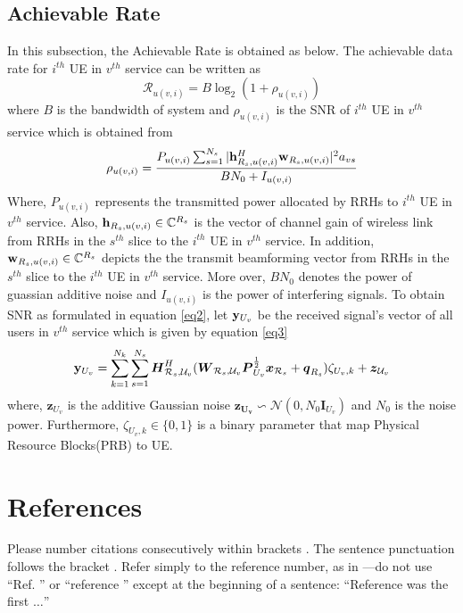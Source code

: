 \documentclass[conference]{IEEEtran}
\begin{document}
\subsection{Achievable Rate}
In this subsection, the Achievable Rate is obtained as below.
The achievable data rate for $i^{th}$ UE in $v^{th}$ service can be written as 
\begin{equation}\label{eq1}
\mathcal{R}_{u(v,i)} = B \log_2({1+ \rho_{u(v,i)}})
\end{equation}
where $B$ is the bandwidth of system and $\rho_{u(v,i)}$ is the SNR of $i^{th}$ UE in $v^{th}$ service which is obtained from 
\begin{equation}\label{eq2}
\rho_{u(v,i)} =  \frac{P_{u(v,i)}\sum_{s=1}^{N_s}|\bold{h}_{R_s,u(v,i)}^H \bold{w}_{R_s,u(v,i)}|^2 a_{vs}}{BN_0 + I_{u(v,i)}}
\end{equation}
Where, $P_{u(v,i)}$ represents the transmitted power allocated by RRHs to $i^{th}$ UE in $v^{th}$ service. Also, 
$\bold{h}_{R_s,u(v,i)} \in \mathbb{C}^{{R}_s}$ is the vector of channel gain of wireless link from RRHs in the $s^{th}$ slice to the $i^{th}$ UE in $v^{th}$ service. In addition, $\bold{w}_{R_s,u(v,i)} \in \mathbb{C}^{{R}_s}$ depicts the the transmit beamforming vector from RRHs in the $s^{th}$ slice to the $i^{th}$ UE in $v^{th}$ service. More over, $BN_0$ denotes the power of guassian additive noise and $I_{u(v,i)}$ is the power of interfering signals. 
To obtain SNR as formulated in equation \eqref{eq2}, let $\bold{y}_{U_v}$ be the received signal's vector of all users in $v^{th}$ service which is given by equation \eqref{eq3}
\begin{equation}\label{eq3}
\bold{y}_{U_v} = \sum_{k=1}^{N_k}\sum_{s = 1}^{N_s} \boldsymbol{H}^H_{\mathcal{R}_s,\mathcal{U}_v}(\boldsymbol{W}_{\mathcal{R}_s,\mathcal{U}_v}\boldsymbol{P}_{U_v}^{\frac{1}{2}}\boldsymbol{x}_{\mathcal{R}_s}+ \boldsymbol{q}_{R_s}) \zeta_{U_v,k}+ \boldsymbol{z}_{\mathcal{U}_v}
\end{equation}
where, $\boldsymbol{z}_{U_v}$ is the additive Gaussian noise $\boldsymbol{z_{U_v}} \backsim \mathcal{N}(0,N_0\boldsymbol{I}_{{U}_v})$ and $N_0$ is the noise power. Furthermore, $\zeta_{U_v,k} \in \{0,1\}$ is a binary parameter that map Physical Resource Blocks(PRB) to UE. 
  
\section*{References}

Please number citations consecutively within brackets \cite{b1}. The 
sentence punctuation follows the bracket \cite{b2}. Refer simply to the reference 
number, as in \cite{b3}---do not use ``Ref. \cite{b3}'' or ``reference \cite{b3}'' except at 
the beginning of a sentence: ``Reference \cite{b3} was the first $\ldots$''
\end{document}
